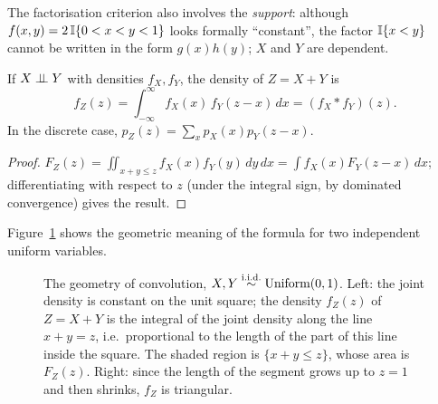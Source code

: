 \documentclass[main.tex]{subfiles}
\begin{document}
\begin{remark}
The factorisation criterion also involves the \emph{support}: although $f(x,y)=2\,\mathbb{I}\{0<x<y<1\}$ looks formally ``constant'', the factor $\mathbb{I}\{x<y\}$ cannot be written in the form $g(x)h(y)$; $X$ and $Y$ are dependent.
\end{remark}

\begin{theorem}\label{thm:konvolusyon}
If $X\perp\!\!\!\perp Y$ with densities $f_X,f_Y$, the density of $Z=X+Y$ is
\[
f_Z(z)=\int_{-\infty}^\infty f_X(x)\,f_Y(z-x)\,dx=(f_X*f_Y)(z).
\]
In the discrete case, $p_Z(z)=\sum_xp_X(x)p_Y(z-x)$.
\end{theorem}
\begin{proof}
$F_Z(z)=\iint_{x+y\le z}f_X(x)f_Y(y)\,dy\,dx=\int f_X(x)F_Y(z-x)\,dx$; differentiating with respect to $z$ (under the integral sign, by dominated convergence) gives the result.
\end{proof}

Figure~\ref{fig:konvolusyon} shows the geometric meaning of the formula for two independent uniform variables.

\begin{figure}[ht]
\centering
{}
\caption{The geometry of convolution, $X,Y\overset{\text{i.i.d.}}{\sim}\text{Uniform}(0,1)$. Left: the joint density is constant on the unit square; the density $f_Z(z)$ of $Z=X+Y$ is the integral of the joint density along the line $x+y=z$, i.e.\ proportional to the length of the part of this line inside the square. The shaded region is $\{x+y\le z\}$, whose area is $F_Z(z)$. Right: since the length of the segment grows up to $z=1$ and then shrinks, $f_Z$ is triangular.}\label{fig:konvolusyon}
\end{figure}
\end{document}
